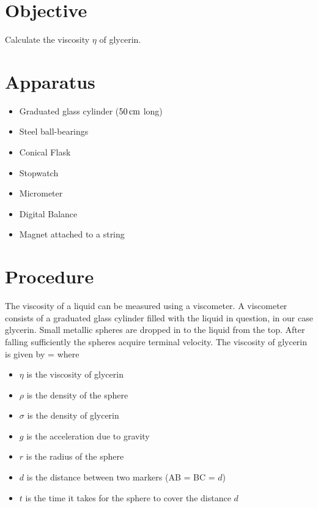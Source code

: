 \section*{Objective}

   Calculate the viscosity $\eta$ of glycerin.

\section*{Apparatus}

   \begin{itemize}

      \item Graduated glass cylinder ($50 \, \si{\centi \metre}$ long)
      \item Steel ball-bearings
      \item Conical Flask
      \item Stopwatch
      \item Micrometer
      \item Digital Balance
      \item Magnet attached to a string

   \end{itemize}

\section*{Procedure}

   The viscosity of a liquid can be measured using a viscometer. A viscometer consists of a graduated glass cylinder filled with the liquid in question, in our case glycerin. Small metallic spheres are dropped in to the liquid from the top. After falling sufficiently the spheres acquire terminal velocity. The viscosity of glycerin is given by 
   \beq \label{main}
      \eta =  
   \eeq
   where
   \begin{itemize}
      \item $\eta$ is the viscosity of glycerin
      \item $\rho$ is the density of the sphere
      \item $\sigma$ is the density of glycerin
      \item $g$ is the acceleration due to gravity
      \item $r$ is the radius of the sphere
      \item $d$ is the distance between two markers (AB = BC = $d$)
      \item $t$ is the time it takes for the sphere to cover the distance $d$
   \end{itemize}


